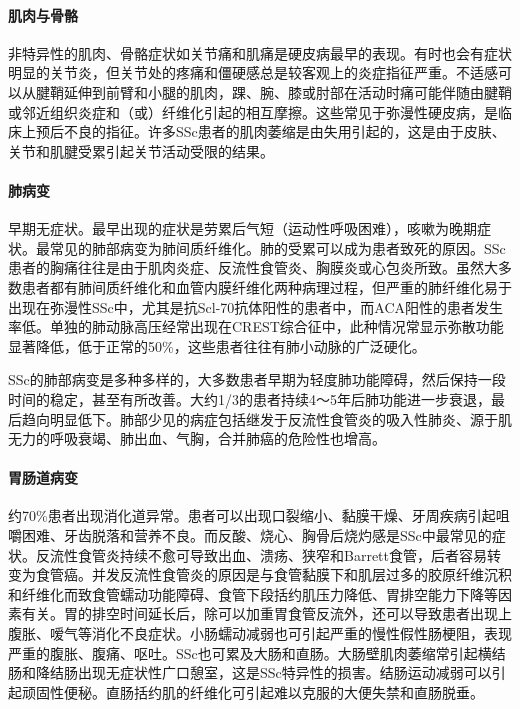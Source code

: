 \paragraph{肌肉与骨骼}

非特异性的肌肉、骨骼症状如关节痛和肌痛是硬皮病最早的表现。有时也会有症状明显的关节炎，但关节处的疼痛和僵硬感总是较客观上的炎症指征严重。不适感可以从腱鞘延伸到前臂和小腿的肌肉，踝、腕、膝或肘部在活动时痛可能伴随由腱鞘或邻近组织炎症和（或）纤维化引起的相互摩擦。这些常见于弥漫性硬皮病，是临床上预后不良的指征。许多SSc患者的肌肉萎缩是由失用引起的，这是由于皮肤、关节和肌腱受累引起关节活动受限的结果。

\paragraph{肺病变}

早期无症状。最早出现的症状是劳累后气短（运动性呼吸困难），咳嗽为晚期症状。最常见的肺部病变为肺间质纤维化。肺的受累可以成为患者致死的原因。SSc患者的胸痛往往是由于肌肉炎症、反流性食管炎、胸膜炎或心包炎所致。虽然大多数患者都有肺间质纤维化和血管内膜纤维化两种病理过程，但严重的肺纤维化易于出现在弥漫性SSc中，尤其是抗Scl-70抗体阳性的患者中，而ACA阳性的患者发生率低。单独的肺动脉高压经常出现在CREST综合征中，此种情况常显示弥散功能显著降低，低于正常的50\%，这些患者往往有肺小动脉的广泛硬化。

SSc的肺部病变是多种多样的，大多数患者早期为轻度肺功能障碍，然后保持一段时间的稳定，甚至有所改善。大约1/3的患者持续4～5年后肺功能进一步衰退，最后趋向明显低下。肺部少见的病症包括继发于反流性食管炎的吸入性肺炎、源于肌无力的呼吸衰竭、肺出血、气胸，合并肺癌的危险性也增高。

\paragraph{胃肠道病变}

约70\%患者出现消化道异常。患者可以出现口裂缩小、黏膜干燥、牙周疾病引起咀嚼困难、牙齿脱落和营养不良。而反酸、烧心、胸骨后烧灼感是SSc中最常见的症状。反流性食管炎持续不愈可导致出血、溃疡、狭窄和Barrett食管，后者容易转变为食管癌。并发反流性食管炎的原因是与食管黏膜下和肌层过多的胶原纤维沉积和纤维化而致食管蠕动功能障碍、食管下段括约肌压力降低、胃排空能力下降等因素有关。胃的排空时间延长后，除可以加重胃食管反流外，还可以导致患者出现上腹胀、嗳气等消化不良症状。小肠蠕动减弱也可引起严重的慢性假性肠梗阻，表现严重的腹胀、腹痛、呕吐。SSc也可累及大肠和直肠。大肠壁肌肉萎缩常引起横结肠和降结肠出现无症状性广口憩室，这是SSc特异性的损害。结肠运动减弱可以引起顽固性便秘。直肠括约肌的纤维化可引起难以克服的大便失禁和直肠脱垂。

